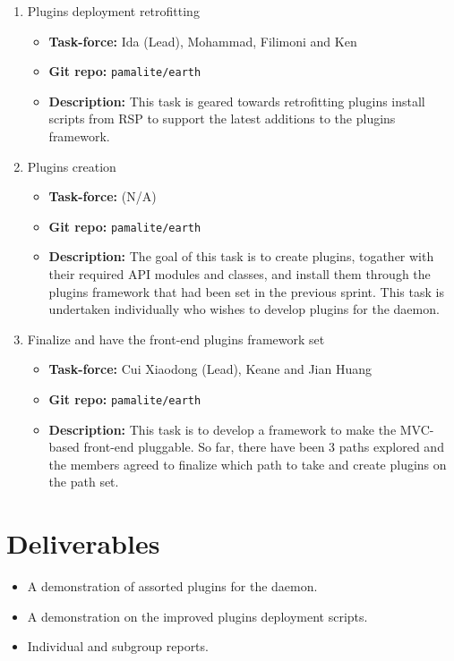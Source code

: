 \documentclass{article}
\begin{document}
\begin{enumerate}
   \item Plugins deployment retrofitting
      \begin{itemize}
         \item \textbf{Task-force:} Ida (Lead), Mohammad, Filimoni and Ken
         \item \textbf{Git repo:} \texttt{pamalite/earth}
         \item \textbf{Description:} This task is geared towards retrofitting plugins install scripts from RSP to support the latest additions to the plugins framework.
      \end{itemize}
   \item Plugins creation
      \begin{itemize}
         \item \textbf{Task-force:} (N/A)
         \item \textbf{Git repo:} \texttt{pamalite/earth}
         \item \textbf{Description:} The goal of this task is to create plugins, togather with their required API modules and classes, and install them through the plugins framework that had been set in the previous sprint. This task is undertaken individually who wishes to develop plugins for the daemon.              
      \end{itemize}
   \item Finalize and have the front-end plugins framework set
      \begin{itemize}
         \item \textbf{Task-force:} Cui Xiaodong (Lead), Keane and Jian Huang
         \item \textbf{Git repo:} \texttt{pamalite/earth}
         \item \textbf{Description:} This task is to develop a framework to make the MVC-based front-end pluggable. So far, there have been 3 paths explored and the members agreed to finalize which path to take and create plugins on the path set.  
      \end{itemize}
\end{enumerate}

\section*{Deliverables}

\begin{itemize}
   \item A demonstration of assorted plugins for the daemon. 
   \item A demonstration on the improved plugins deployment scripts.
   \item Individual and subgroup reports.
\end{itemize}
\end{document}
